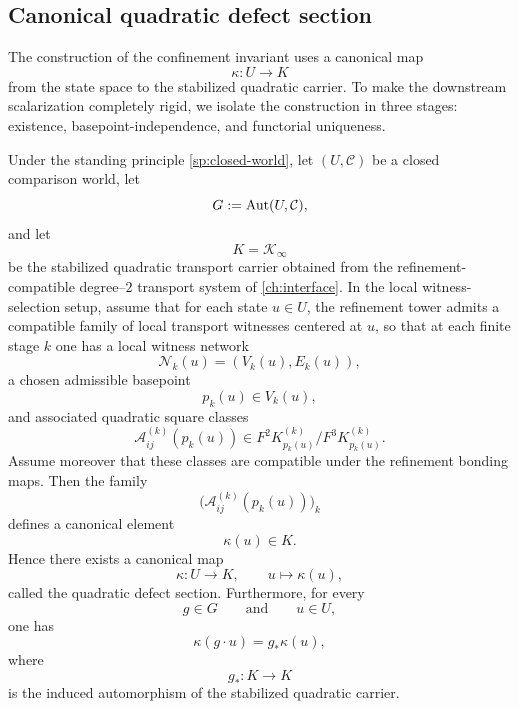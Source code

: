 \subsection*{Canonical quadratic defect section}
The construction of the confinement invariant uses a canonical map
\[
	\kappa:U\to K
\]
from the state space to the stabilized quadratic carrier.
To make the downstream scalarization completely rigid, we isolate the
construction in three stages:
existence, basepoint-independence, and functorial uniqueness.
\begin{theorem}
	\label{thm:fusion-kappa}
	Under the standing principle \cref{sp:closed-world}, let
	\((U,\mathcal C)\) be a closed comparison world, let
	\[
		G:=\operatorname{Aut}(U,\mathcal C),
	\]
	and let
	\[
		K=\mathcal K_\infty
	\]
	be the stabilized quadratic transport carrier obtained from the
	refinement-compatible degree--\(2\) transport system of
	\cref{ch:interface}.
	In the local witness-selection setup, assume that for each state
	\(u\in U\), the refinement tower admits a
	compatible family of local transport witnesses centered at \(u\), so
	that at each finite stage \(k\) one has a local witness network
	\[
		\mathcal N_k(u)=(V_k(u),E_k(u)),
	\]
	a chosen admissible basepoint
	\[
		p_k(u)\in V_k(u),
	\]
	and associated quadratic square classes
	\[
		\mathcal A_{ij}^{(k)}(p_k(u))
		\in
		F^2K_{p_k(u)}^{(k)}/F^3K_{p_k(u)}^{(k)}.
	\]
	Assume moreover that these classes are compatible under the refinement
	bonding maps.
	Then the family
	\[
		\bigl(\mathcal A_{ij}^{(k)}(p_k(u))\bigr)_k
	\]
	defines a canonical element
	\[
		\kappa(u)\in K.
	\]
	Hence there exists a canonical map
	\[
		\kappa:U\to K,
		\qquad
		u\longmapsto \kappa(u),
	\]
	called the quadratic defect section.
	Furthermore, for every
	\[
		g\in G
		\qquad\text{and}\qquad
		u\in U,
	\]
	one has
	\[
		\kappa(g\cdot u)=g_*\kappa(u),
	\]
	where
	\[
		g_*:K\to K
	\]
	is the induced automorphism of the stabilized quadratic carrier.
\end{theorem}
